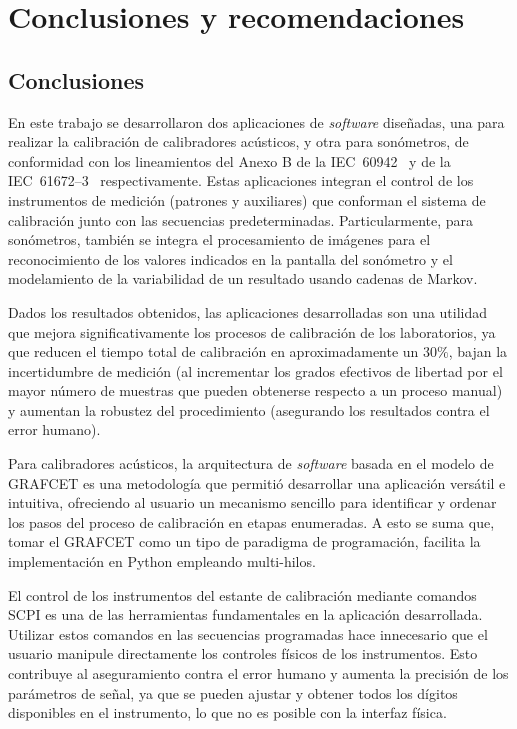 
\chapter{Conclusiones y recomendaciones}
\section{Conclusiones}
En este trabajo se desarrollaron dos aplicaciones de \emph{software} diseñadas, una para realizar la calibración de calibradores
acústicos, y otra para sonómetros, de conformidad con los lineamientos del Anexo B de la \mbox{IEC 60942}~\citeyearpar{IEC_TC29_2017}
y de la \mbox{IEC 61672--3}~\citeyearpar{IEC_TC29_2013_3} respectivamente.
Estas aplicaciones integran el control de los instrumentos de medición (patrones y auxiliares) que conforman el sistema de
calibración junto con las secuencias predeterminadas.
Particularmente, para sonómetros, también se integra el procesamiento de imágenes para el reconocimiento de los valores
indicados en la pantalla del sonómetro y el modelamiento de la variabilidad de un resultado usando cadenas de Markov.

Dados los resultados obtenidos, las aplicaciones desarrolladas son una utilidad que mejora significativamente los procesos
de calibración de los laboratorios, ya que reducen el tiempo total de calibración en aproximadamente un $30\%$,
bajan la incertidumbre de medición (al incrementar los grados efectivos de libertad por el mayor número de muestras que
pueden obtenerse respecto a un proceso manual) y aumentan la robustez del procedimiento (asegurando los resultados contra
el error humano).

Para calibradores acústicos, la arquitectura de \emph{software} basada en el modelo de GRAFCET es una metodología
que permitió desarrollar una aplicación versátil e intuitiva, ofreciendo al usuario un mecanismo sencillo para identificar
y ordenar los pasos del proceso de calibración en etapas enumeradas.
A esto se suma que, tomar el GRAFCET como un tipo de paradigma de programación, facilita la implementación en Python
empleando multi-hilos.

El control de los instrumentos del estante de calibración mediante comandos SCPI es una de las herramientas fundamentales
en la aplicación desarrollada.
Utilizar estos comandos en las secuencias programadas hace innecesario que el usuario manipule directamente los controles
físicos de los instrumentos.
Esto contribuye al aseguramiento contra el error humano y aumenta la precisión de los parámetros de señal, ya que se pueden
ajustar y obtener todos los dígitos disponibles en el instrumento, lo que no es posible con la interfaz física.


